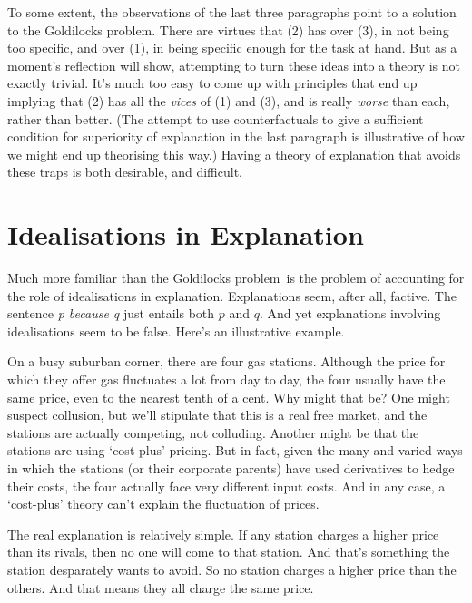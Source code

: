 \documentclass[
  11pt,
  letterpaper,
  DIV=11,
  numbers=noendperiod,
  oneside]{scrartcl}
\begin{document}
To some extent, the observations of the last three paragraphs point to a
solution to the Goldilocks problem. There are virtues that (2) has over
(3), in not being too specific, and over (1), in being specific enough
for the task at hand. But as a moment's reflection will show, attempting
to turn these ideas into a theory is not exactly trivial. It's much too
easy to come up with principles that end up implying that (2) has all
the \emph{vices} of (1) and (3), and is really \emph{worse} than each,
rather than better. (The attempt to use counterfactuals to give a
sufficient condition for superiority of explanation in the last
paragraph is illustrative of how we might end up theorising this way.)
Having a theory of explanation that avoids these traps is both
desirable, and difficult.

\section{Idealisations in
Explanation}\label{idealisations-in-explanation}

Much more familiar than the Goldilocks problem~is the problem of
accounting for the role of idealisations in explanation. Explanations
seem, after all, factive. The sentence \emph{p because q} just entails
both \(p\) and \(q\). And yet explanations involving idealisations seem
to be false. Here's an illustrative example.

On a busy suburban corner, there are four gas stations. Although the price for
which they offer gas fluctuates a lot from day to day, the four usually
have the same price, even to the nearest tenth of a cent. Why might that
be? One might suspect collusion, but we'll stipulate that this is a real
free market, and the stations are actually competing, not colluding.
Another might be that the stations are using `cost-plus' pricing. But in
fact, given the many and varied ways in which the stations (or their
corporate parents) have used derivatives to hedge their costs, the four
actually face very different input costs. And in any case, a `cost-plus'
theory can't explain the fluctuation of prices.

The real explanation is relatively simple. If any station charges a
higher price than its rivals, then no one will come to that station. And
that's something the station desparately wants to avoid. So no station
charges a higher price than the others. And that means they all charge
the same price.
\end{document}
